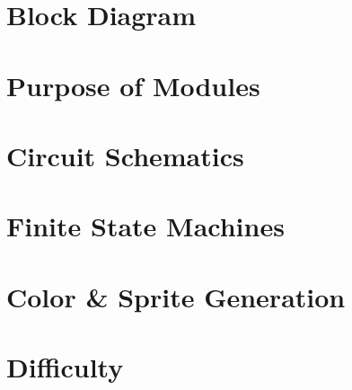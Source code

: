 \documentclass[journal, twocolumn, final,11pt,letterpaper]{IEEEtran}
\begin{document}
\section{Block Diagram} 

\section{Purpose of Modules}

\section{Circuit Schematics}

\section{Finite State Machines}


\section{Color \& Sprite Generation}

\section{ Difficulty}
%

\end{document}
